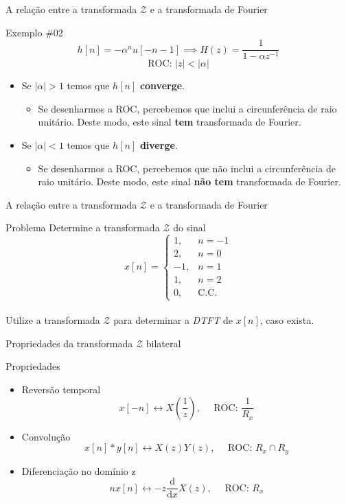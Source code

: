 \begin{frame}{A relação entre a transformada $\mathcal{Z}$ e a transformada de Fourier}
\begin{block}{Exemplo \#02}
$$h[n] = -\alpha^n u[-n-1] \implies H(z) = \dfrac{1}{1 - \alpha z^{-1}}$$
$$\text{ROC: } |z|<|\alpha|$$
\begin{itemize}
    \item Se $|\alpha| > 1$ temos que $h[n]$ \textbf{converge}.
    \begin{itemize}
        \item Se desenharmos a ROC, percebemos que inclui a circunferência de raio unitário. Deste modo, este sinal \textbf{tem} transformada de Fourier.
    \end{itemize}
    \item Se $|\alpha| < 1$ temos que $h[n]$ \textbf{diverge}.
    \begin{itemize}
        \item Se desenharmos a ROC, percebemos que não inclui a circunferência de raio unitário. Deste modo, este sinal \textbf{não tem} transformada de Fourier.
    \end{itemize}
\end{itemize}
\end{block}
\end{frame}

\begin{frame}{A relação entre a transformada $\mathcal{Z}$ e a transformada de Fourier}
\begin{block}{Problema}
	Determine a transformada $\mathcal{Z}$ do sinal\\
	$$ x[n] = \left\{\begin{matrix}
	1, & n = -1\\ 
	2, & n = 0\\ 
	-1, & n = 1\\ 
	1, & n = 2\\ 
	0, & \text{C.C.}
	\end{matrix}\right. $$\\
	Utilize a transformada $\mathcal{Z}$ para determinar a \textit{DTFT} de $x[n]$, caso exista.
\end{block}
\end{frame}

\begin{frame}{Propriedades da transformada $\mathcal{Z}$ bilateral}
\begin{block}{Propriedades}
	\begin{itemize}
		\item Reversão temporal
		$$ x[-n] \longleftrightarrow X\left( \dfrac{1}{z} \right), \quad \text{ ROC: } \dfrac{1}{R_x}$$
		\item Convolução
		$$ x[n]\ast y[n]  \longleftrightarrow X(z)Y(z), \quad \text{ ROC: } R_x \cap R_y $$
		\item Diferenciação no domínio z
		$$ nx[n] \longleftrightarrow -z\frac{\mathrm{d} }{\mathrm{d} x} X(z), \quad \text{ ROC: } R_x $$
	\end{itemize}
\end{block}
\end{frame}

